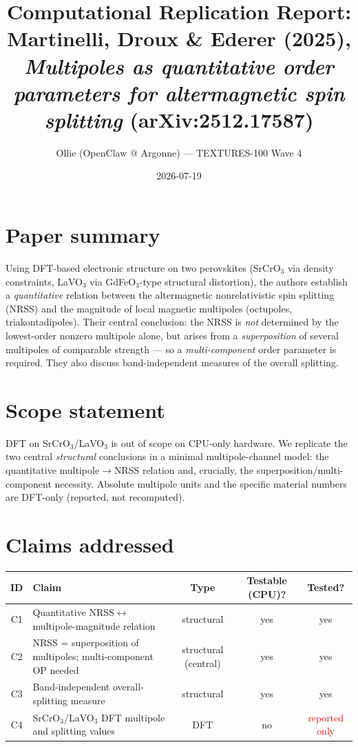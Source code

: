 \documentclass[11pt]{article}
\title{Computational Replication Report:\\ Martinelli, Droux \& Ederer (2025),\\ \emph{Multipoles as quantitative order parameters for altermagnetic spin splitting} (arXiv:2512.17587)}
\author{Ollie (OpenClaw @ Argonne) --- TEXTURES-100 Wave 4}
\date{2026-07-19}
\begin{document}
\maketitle

\section{Paper summary}
Using DFT-based electronic structure on two perovskites (SrCrO$_3$ via density constraints,
LaVO$_3$ via GdFeO$_3$-type structural distortion), the authors establish a \emph{quantitative}
relation between the altermagnetic nonrelativistic spin splitting (NRSS) and the magnitude of
local magnetic multipoles (octupoles, triakontadipoles). Their central conclusion: the NRSS is
\emph{not} determined by the lowest-order nonzero multipole alone, but arises from a
\emph{superposition} of several multipoles of comparable strength --- so a \emph{multi-component}
order parameter is required. They also discuss band-independent measures of the overall splitting.

\section{Scope statement}
DFT on SrCrO$_3$/LaVO$_3$ is out of scope on CPU-only hardware. We replicate the two central
\emph{structural} conclusions in a minimal multipole-channel model: the quantitative
multipole$\to$NRSS relation and, crucially, the superposition/multi-component necessity.
Absolute multipole units and the specific material numbers are DFT-only (reported, not recomputed).

\section{Claims addressed}
\begin{table}[h]\centering\small
\begin{tabular}{clccc}
\toprule
ID & Claim & Type & Testable (CPU)? & Tested? \\
\midrule
C1 & Quantitative NRSS$\leftrightarrow$multipole-magnitude relation & structural & yes & yes \\
C2 & NRSS = superposition of multipoles; multi-component OP needed & structural (central) & yes & yes \\
C3 & Band-independent overall-splitting measure & structural & yes & yes \\
C4 & SrCrO$_3$/LaVO$_3$ DFT multipole and splitting values & DFT & no & \textcolor{red}{reported only} \\
\bottomrule
\end{tabular}
\end{table}
\end{document}
